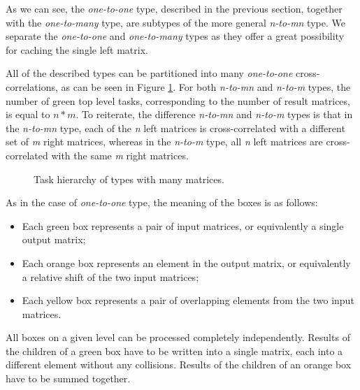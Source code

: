 As we can see, the \textit{one-to-one} type, described in the previous section, together with the \textit{one-to-many} type, are subtypes of the more general \textit{n-to-mn} type. We separate the \textit{one-to-one} and \textit{one-to-many} types as they offer a great possibility for caching the single left matrix.

All of the described types can be partitioned into many \textit{one-to-one} cross-correlations, as can be seen in Figure \ref{fig:cross_corr_many_tasks}. For both \textit{n-to-mn} and \textit{n-to-m} types, the number of green top level tasks, corresponding to the number of result matrices, is equal to $n*m$. To reiterate, the difference \textit{n-to-mn} and \textit{n-to-m} types is that in the \textit{n-to-mn} type, each of the \textit{n} left matrices is cross-correlated with a different set of \textit{m} right matrices, whereas in the \textit{n-to-m} type, all \textit{n} left matrices are cross-correlated with the same \textit{m} right matrices.

\begin{figure}[ht]
	\centering
	\def\svgwidth{0.8\textwidth}
	
	\caption{Task hierarchy of types with many matrices.}
	\label{fig:cross_corr_many_tasks}
\end{figure}

As in the case of \textit{one-to-one} type, the meaning of the boxes is as follows:

\begin{itemize}
	\item Each green box represents a pair of input matrices, or equivalently a single output matrix;
	\item Each orange box represents an element in the output matrix, or equivalently a relative shift of the two input matrices;
	\item Each yellow box represents a pair of overlapping elements from the two input matrices.
\end{itemize}

All boxes on a given level can be processed completely independently.  Results of the children of a green box have to be written into a single matrix, each into a different element without any collisions. Results of the children of an orange box have to be summed together.


